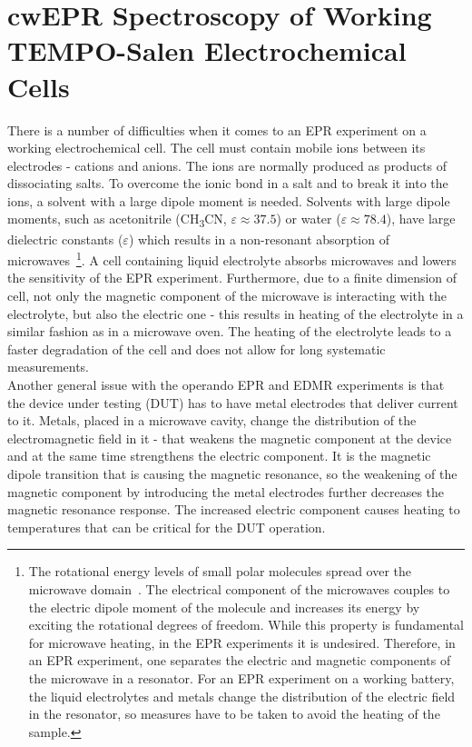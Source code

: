 \section{cwEPR Spectroscopy of Working\\TEMPO-Salen Electrochemical Cells}
There is a number of difficulties when it comes to an EPR experiment on a working electrochemical cell. The cell must contain mobile ions between its electrodes - cations and anions. The ions are normally produced as products of dissociating salts. To overcome the ionic bond in a salt and to break it into the ions, a solvent with a large dipole moment is needed. Solvents with large dipole moments, such as acetonitrile (CH\textsubscript{3}CN, $\varepsilon\approx 37.5$) or water ($\varepsilon\approx78.4$), have large dielectric constants ($\varepsilon$) which results in a non-resonant absorption of microwaves~\footnote{The rotational energy levels of small polar molecules spread over the microwave domain~\cite{Dermtroeder_3}. The electrical component of the microwaves couples to the electric dipole moment of the molecule and increases its energy by exciting the rotational degrees of freedom. While this property is fundamental for microwave heating, in the EPR experiments it is undesired. Therefore, in an EPR experiment, one separates the electric and magnetic components of the microwave in a resonator. For an EPR experiment on a working battery, the liquid electrolytes and metals change the distribution of the electric field in the resonator, so measures have to be taken to avoid the heating of the sample.}. A cell containing liquid electrolyte absorbs microwaves and lowers the sensitivity of the EPR experiment. Furthermore, due to a finite dimension of cell, not only the magnetic component of the microwave is interacting with the electrolyte, but also the electric one - this results in heating of the electrolyte in a similar fashion as in a microwave oven. The heating of the electrolyte leads to a faster degradation of the cell and does not allow for long systematic measurements.\\
Another general issue with the operando EPR and EDMR experiments is that the device under testing (DUT) has to have metal electrodes that deliver current to it. Metals, placed in a microwave cavity, change the distribution of the electromagnetic field in it - that weakens the magnetic component at the device and at the same time strengthens the electric component. It is the magnetic dipole transition that is causing the magnetic resonance, so the weakening of the magnetic component by introducing the metal electrodes further decreases the magnetic resonance response. The increased electric component causes heating to temperatures that can be critical for the DUT operation.

